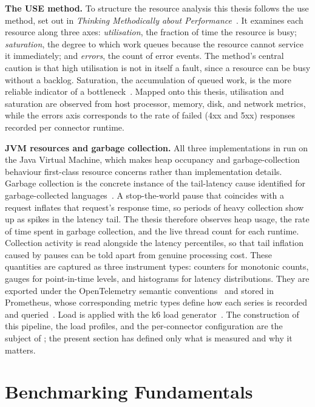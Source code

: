 \textbf{The USE method.} To structure the resource analysis this thesis follows the \gls{use} method, set out in \emph{Thinking Methodically about Performance}~\citep{gregg2012thinking}. It examines each resource along three axes: \emph{utilisation}, the fraction of time the resource is busy; \emph{saturation}, the degree to which work queues because the resource cannot service it immediately; and \emph{errors}, the count of error events. The method's central caution is that high utilisation is not in itself a fault, since a resource can be busy without a backlog. Saturation, the accumulation of queued work, is the more reliable indicator of a bottleneck~\citep{gregg2012thinking}. Mapped onto this thesis, utilisation and saturation are observed from host processor, memory, disk, and network metrics, while the errors axis corresponds to the rate of failed (4xx and 5xx) responses recorded per connector runtime.

\textbf{JVM resources and garbage collection.} All three implementations in  run on the Java Virtual Machine, which makes heap occupancy and garbage-collection behaviour first-class resource concerns rather than implementation details. Garbage collection is the concrete instance of the tail-latency cause identified for garbage-collected languages~\citep{dean2013tail}. A stop-the-world pause that coincides with a request inflates that request's response time, so periods of heavy collection show up as spikes in the latency tail. The thesis therefore observes heap usage, the rate of time spent in garbage collection, and the live thread count for each runtime. Collection activity is read alongside the latency percentiles, so that tail inflation caused by pauses can be told apart from genuine processing cost. These quantities are captured as three instrument types: counters for monotonic counts, gauges for point-in-time levels, and histograms for latency distributions. They are exported under the OpenTelemetry semantic conventions~\citep{opentelemetrySemconv} and stored in Prometheus, whose corresponding metric types define how each series is recorded and queried~\citep{prometheusMetricTypes}. Load is applied with the k6 load generator~\citep{k6docs}. The construction of this pipeline, the load profiles, and the per-connector configuration are the subject of ; the present section has defined only what is measured and why it matters.


\section{Benchmarking Fundamentals}\label{sec:benchmarking-fundamentals}

